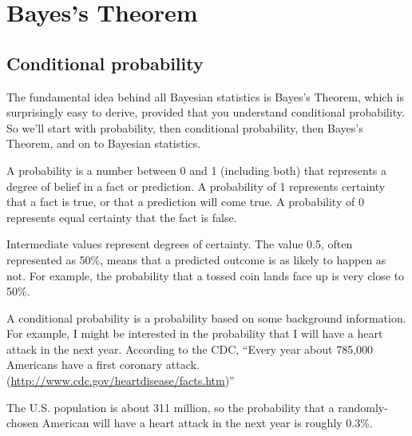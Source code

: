 \documentclass[12pt]{book}
\begin{document}
\normalsize

\clearemptydoublepage

\begin{latexonly}

\tableofcontents

\clearemptydoublepage

\end{latexonly}

\mainmatter

\newcommand{\p}[1]{\ensuremath{\mathrm{p}(#1)}}
\renewcommand{\o}[1]{\ensuremath{\mathrm{o}(#1)}}
\newcommand{\T}[1]{\mbox{#1}}
\newcommand{\AND}{~\mathrm{and}~}
\newcommand{\NOT}{\mathrm{not}~}


\chapter{Bayes's Theorem}
\label{intro}

\section{Conditional probability}

The fundamental idea behind all Bayesian statistics is Bayes's Theorem,
which is surprisingly easy to derive, provided that you understand
conditional probability.  So we'll start with probability, then
conditional probability, then Bayes's Theorem, and on to Bayesian
statistics.

A probability is a number between 0 and 1 (including both) that
represents a degree of belief in a fact or prediction.  A probability
of 1 represents certainty that a fact is true, or that a prediction
will come true.  A probability of 0 represents equal certainty
that the fact is false.

Intermediate values represent degrees of certainty.  The value 0.5,
often represented as 50\%, means that a predicted outcome is
as likely to happen as not.  For example, the probability that a tossed
coin lands face up is very close to 50\%.

A conditional probability is a probability based on some background
information.  For example, I might be interested in the probability
that I will have a heart attack in the next year.  According to the
CDC, ``Every year about 785,000 Americans have a first coronary attack.
(\url{http://www.cdc.gov/heartdisease/facts.htm})''

The U.S. population is about 311 million, so the probability that a
randomly-chosen American will have a heart attack in the next year is
roughly 0.3\%.
\end{document}

